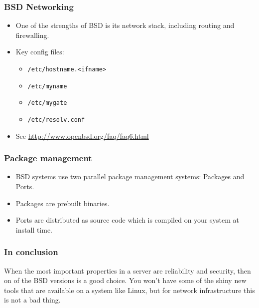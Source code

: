 \documentclass[10pt]{beamer}
\begin{document}
\begin{frame}
	\frametitle{BSD Networking}
	\begin{itemize}
		\item One of the strengths of BSD is its network stack, including routing and firewalling.
		\item Key config files:
		\begin{itemize}
			\item \texttt{/etc/hostname.<ifname>}
			\item \texttt{/etc/myname}
			\item \texttt{/etc/mygate}
			\item \texttt{/etc/resolv.conf}
		\end{itemize}
		\item See \url{http://www.openbsd.org/faq/faq6.html}
	\end{itemize}  
\end{frame}

\begin{frame}
  \frametitle{Package management}
  \begin{itemize}
    \item BSD systems use two parallel package management systems: Packages and Ports.
    \item Packages are prebuilt binaries.
    \item Ports are distributed as source code which is compiled on your
          system at install time.
  \end{itemize}  
\end{frame}

\begin{frame}
  \frametitle{In conclusion}

   When the most important properties in a server are reliability and
   security, then on of the BSD versions is a good choice.  You won't 
   have some of the shiny new tools that are available on a system like Linux,
   but for network infrastructure this is not a bad thing.
\end{frame}
\end{document}

